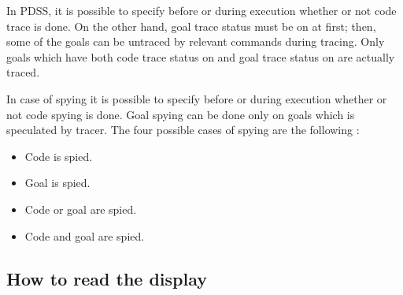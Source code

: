 In PDSS, it is possible to specify before or during execution whether or not
code trace is done. On the other hand, goal trace status must be on at first;
then, some of the goals can be untraced by relevant commands during tracing.
Only goals which have both code trace status on and goal trace status on
are actually traced.

In case of spying it is possible to specify before or during execution whether
or not code spying is done. Goal spying can be done only on goals which is
speculated by tracer. The four possible cases of spying are the following :
\begin{itemize}
\item Code is spied.
\item Goal is spied.
\item Code or goal are spied.
\item Code and goal are spied.
\end{itemize}

\subsection{How to read the display}


